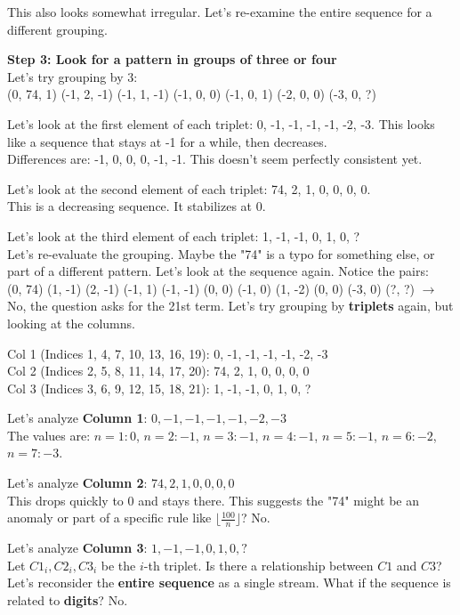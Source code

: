 \documentclass[11pt, a4paper]{article}
\begin{document}
\begin{mdframed}[backgroundcolor=modelBcolor, linecolor=green!20, roundcorner=5pt, innertopmargin=10pt, innerbottommargin=10pt, innerleftmargin=10pt, innerrightmargin=10pt]
This also looks somewhat irregular. Let's re-examine the entire sequence for a different grouping.

\textbf{Step 3: Look for a pattern in groups of three or four} \\
Let's try grouping by 3: \\
(0, 74, 1) \quad (-1, 2, -1) \quad (-1, 1, -1) \quad (-1, 0, 0) \quad (-1, 0, 1) \quad (-2, 0, 0) \quad (-3, 0, ?)

Let's look at the first element of each triplet: 0, -1, -1, -1, -1, -2, -3. This looks like a sequence that stays at -1 for a while, then decreases. \\
Differences are: -1, 0, 0, 0, -1, -1. This doesn't seem perfectly consistent yet.

Let's look at the second element of each triplet: 74, 2, 1, 0, 0, 0, 0. \\
This is a decreasing sequence. It stabilizes at 0.

Let's look at the third element of each triplet: 1, -1, -1, 0, 1, 0, ? \\
Let's re-evaluate the grouping. Maybe the "74" is a typo for something else, or part of a different pattern. Let's look at the sequence again. Notice the pairs: \\
(0, 74) (1, -1) (2, -1) (-1, 1) (-1, -1) (0, 0) (-1, 0) (1, -2) (0, 0) (-3, 0) (?, ?) $\rightarrow$ No, the question asks for the 21st term. Let's try grouping by \textbf{triplets} again, but looking at the columns.

Col 1 (Indices 1, 4, 7, 10, 13, 16, 19): 0, -1, -1, -1, -1, -2, -3 \\
Col 2 (Indices 2, 5, 8, 11, 14, 17, 20): 74, 2, 1, 0, 0, 0, 0 \\
Col 3 (Indices 3, 6, 9, 12, 15, 18, 21): 1, -1, -1, 0, 1, 0, ?

Let's analyze \textbf{Column 1}: $0, -1, -1, -1, -1, -2, -3$ \\
The values are: $n=1: 0$, $n=2: -1$, $n=3: -1$, $n=4: -1$, $n=5: -1$, $n=6: -2$, $n=7: -3$.

Let's analyze \textbf{Column 2}: $74, 2, 1, 0, 0, 0, 0$ \\
This drops quickly to 0 and stays there. This suggests the "74" might be an anomaly or part of a specific rule like $\lfloor \frac{100}{n} \rfloor$? No.

Let's analyze \textbf{Column 3}: $1, -1, -1, 0, 1, 0, ?$ \\
Let $C1_i, C2_i, C3_i$ be the $i$-th triplet. Is there a relationship between $C1$ and $C3$? \\
Let's reconsider the \textbf{entire sequence} as a single stream. What if the sequence is related to \textbf{digits}? No.


\end{mdframed}
\end{document}
